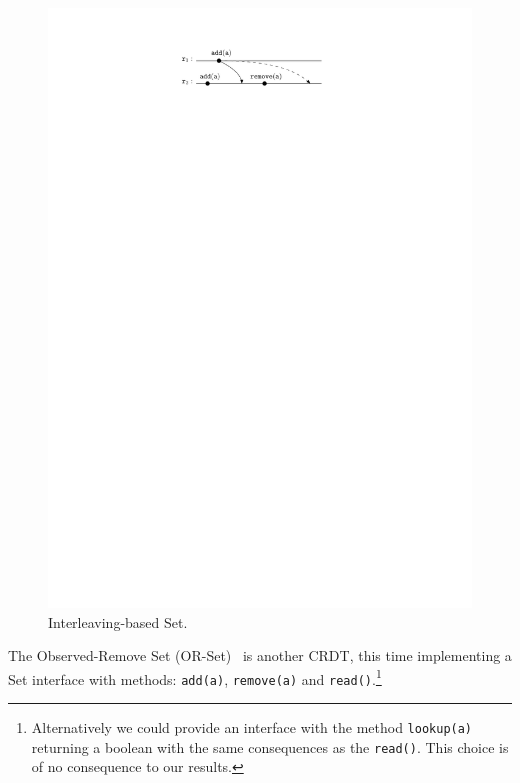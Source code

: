 \begin{figure}
\vspace{-4mm}
  \centering
  \includegraphics[width=0.35 \textwidth]{./figures/OR-Set-simple}
  \caption{Interleaving-based Set.}
  \label{fig:or-set-simple}
\end{figure}
The Observed-Remove Set (OR-Set)~\cite{ShapiroPBZ11} is another CRDT,
this time implementing a Set interface with methods: \lstinline|add(a)|,
\lstinline|remove(a)| and \lstinline|read()|.\footnote{Alternatively
  we could provide an interface with the method \lstinline|lookup(a)|
  returning a boolean with the same consequences as the
  \lstinline|read()|. This choice is of no consequence to our results.}
%

